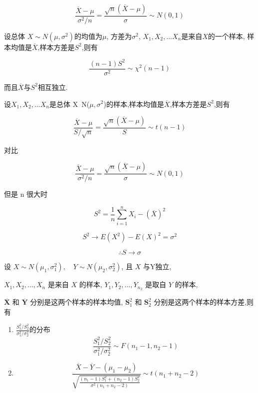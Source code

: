 \begin{corollary}
    $$
        \frac{\overline{X}-\mu}{\sigma^2/n} = \frac{\sqrt{n}(\overline{X}-\mu)}{\sigma} \sim N(0,1)
    $$
\end{corollary}

\begin{theorem}[样本方差的分布]
    设总体 $X\sim N(\mu,\sigma^2)$的均值为$\mu$, 方差为$σ^2$, $X_1,X_2,...X_n$是来自$X$的一个样本, 样本均值是$\overline{X}$,样本方差是$S^2$,则有

    $$
        { \frac{(n-1)S^2}{\sigma^2} \sim \chi^2(n-1)}
    $$

    而且$\overline{X}$与$S^2$相互独立.
\end{theorem}

\begin{theorem}[样本均值和样本方差的关系]
    设$X_1,X_2,...X_n$是总体 X~N($\mu,\sigma^2$)的样本,样本均值是$\overline{X}$,样本方差是$S^2$,则有

    $$
        {\frac{\overline{X}-\mu}{S / \sqrt{n}} = \frac{\sqrt{n}(\overline{X} - \mu)}{{ S}} \sim t(n-1)}
    $$

    对比

    $$
        \frac{\overline{X}-\mu}{\sigma^2/n} = \frac{\sqrt{n}(\overline{X}-\mu)}{{ \sigma}} \sim N(0,1)
    $$

    但是 n 很大时

    $$
        S^2 = \frac{1}{n} \sum_{i=1}^n X_i - (\overline{X})^2
    $$

    $$
        S^2 \to E(X^2) - E(X)^2= \sigma^2
    $$

    $$
        \therefore S \to \sigma
    $$
\end{theorem}

\begin{theorem}
    设 $ X \sim N\left(\mu_{1}, \sigma_{1}^{2}\right), \quad Y \sim N\left(\mu_{2}, \sigma_{2}^{2}\right) $, 且 $ X $ 与Y独立,

    $ X_{1}, X_{2}, \ldots, X_{n} $ 是来自 $ X $ 的样本, $ Y_{1}, Y_{2}, \ldots, Y_{n_{2}} $ 是取自 $ Y $ 的样本,

    $ \overline{\boldsymbol{X}} $ 和 $ \overline{\boldsymbol{Y}} $ 分别是这两个样本的样本均值, $ \boldsymbol{S}_{1}^{2} $ 和 $ \boldsymbol{S}_{2}^{2} $ 分别是这两个样本的样本方差,则有

    \begin{enumerate}
        \item $\frac{S_1^2/S^2_2}{\sigma_1^2 / \sigma_2^2}$的分布
              $$
                  {
                          \frac{S_1^2/S^2_2}{\sigma_1^2 / \sigma_2^2} \sim F(n_1 - 1, n_2 -1)}
              $$
        \item $$
                  \frac{\overline{X} - \overline{Y}- (\mu_1 - \mu_2 )}{\sqrt{ \frac{(n_1 - 1) S_1^2 + (n_2 - 1 ) S_2^2 }{\sigma^2 (n_1+n_2-2)} }} \sim t(n_1+n_2-2)
              $$
    \end{enumerate}

\end{theorem}

